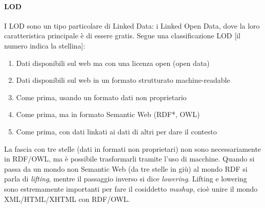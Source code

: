 \paragraph*{LOD}I LOD sono un tipo particolare di Linked Data: i Linked Open Data, dove la loro caratteristica principale \`e di essere gratis. Segue una classificazione LOD [il numero indica la stellina]:
\begin{enumerate}

\item Dati disponibili sul web ma con una licenza open (open data)
\item Dati disponibili sul web in un formato strutturato machine-readable
\item Come prima, usando un formato dati non proprietario
\item Come prima, ma in formato Semantic Web (RDF*, OWL)
\item Come prima, con dati linkati ai dati di altri per dare il contesto
\end{enumerate}


La fascia con tre stelle (dati in formati non proprietari) non sono necessariamente in RDF/OWL, ma \`e possibile trasformarli tramite l'uso di macchine. Quando si passa da un mondo non Semantic Web (da tre stelle in gi\`u) al mondo RDF si parla di \textit{lifting}, mentre il passaggio inverso si dice \textit{lowering}.
Lifting e lowering sono estremamente importanti per fare il cosiddetto \textit{mashup}, cio\`e unire il mondo XML/HTML/XHTML con RDF/OWL.
